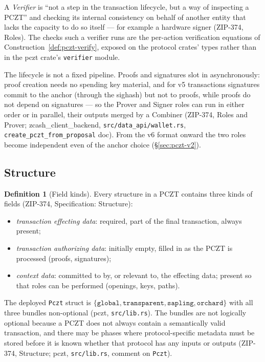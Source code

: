 \documentclass[11pt,a4paper]{article}
\theoremstyle{definition}
\newtheorem{definition}[theorem]{Definition}
\begin{document}
A \emph{Verifier} is ``not a step in the transaction lifecycle, but a way
of inspecting a PCZT'' and checking its internal consistency on behalf of
another entity that lacks the capacity to do so itself --- for example a
hardware signer (ZIP-374, Roles). The checks such a
verifier runs are the per-action verification equations of
Construction~\ref{def:pczt-verify}, exposed on the protocol crates'
types rather than in the \textsf{pczt} crate's \texttt{verifier} module.

The lifecycle is not a fixed pipeline. Proofs and signatures slot in
asynchronously: proof creation needs no spending key material, and for v5
transactions signatures commit to the anchor (through the sighash) but not
to proofs, while proofs do not depend on signatures --- so the Prover and
Signer roles can run in either order or in parallel, their outputs merged
by a Combiner (ZIP-374, Roles and Prover;
\textsf{zcash\_client\_backend}, \texttt{src/data\_api/wallet.rs},
\texttt{create\_pczt\_from\_proposal} doc). From the v6 format onward the
two roles become independent even of the anchor choice
(\S\ref{sec:pczt-v2}).

\subsection{Structure}\label{sec:pczt-structure}

\begin{definition}[Field kinds]\label{def:pczt-field-kinds}
Every structure in a PCZT contains three kinds of fields (ZIP-374,
Specification: Structure):
\begin{itemize}
\item \emph{transaction effecting data}: required, part of the final
  transaction, always present;
\item \emph{transaction authorizing data}: initially empty, filled in as
  the PCZT is processed (proofs, signatures);
\item \emph{context data}: committed to by, or relevant to, the effecting
  data; present so that roles can be performed (openings, keys, paths).
\end{itemize}
\end{definition}

The deployed \texttt{Pczt} struct is
$\{\texttt{global}, \texttt{transparent}, \texttt{sapling},
\texttt{orchard}\}$ with all three bundles non-optional (\textsf{pczt},
\texttt{src/lib.rs}). The bundles are not logically optional because a
PCZT does not always contain a semantically valid transaction, and there
may be phases where protocol-specific metadata must be stored before it is
known whether that protocol has any inputs or outputs (ZIP-374, Structure;
\textsf{pczt}, \texttt{src/lib.rs}, comment on \texttt{Pczt}).
\end{document}
